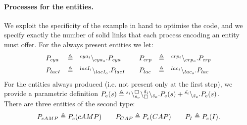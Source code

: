 \paragraph{Processes for the entities.}
We exploit the specificity of the example in hand to optimise the code, and we specify exactly
the number of solid links that each process encoding an entity must offer.
For the always present entities  we let:
\[
\begin{array}{lcl@{\qquad}lcl}
P_{cya}&\defeq&\link{cya_i}{cya_o}.P_{cya} &
P_{crp}&\defeq&\link{crp_i}{crp_o}.P_{crp}\\[5pt]
P_{lacI}&\defeq& \link{lacI_i}{lacI_o}.P_{lacI} &
 P_{lac}&\defeq&\link{lac_i}{lac_o}.P_{lac}
\end{array}\]
For the entities always produced (i.e. not present only at the first step), we  provide a  parametric
definition  
$P_e(s) \triangleq  {}^{s_i}\backslash_{s_o}^{\scriptstyle {\square}}\backslash_{\scriptstyle {\square}}^{\tilde{s}_i}\backslash_{\tilde{s}_o}.P_e(s) +  {}^{\tilde{s_i}}\backslash_{\tilde{s}_o} .P_e(s) $.\\
 There are three entities of the second type:  $$P_{cAMP}\triangleq P_e(cAMP) \qquad P_{CAP} \triangleq P_e(CAP)\qquad P_I \triangleq P_e(I).$$


